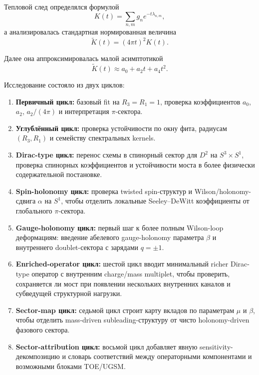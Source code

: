 \documentclass[12pt,a4paper]{article}
\begin{document}
Тепловой след определялся формулой
\begin{equation}
K(t)=\sum_{n,m} g_n e^{-t\lambda_{n,m}},
\end{equation}
а анализировалась стандартная нормированная величина
\begin{equation}
\widetilde K(t)=(4\pi t)^2 K(t).
\end{equation}

Далее она аппроксимировалась малой асимптотикой
\begin{equation}
\widetilde K(t)\approx a_0+a_2 t+a_4 t^2.
\end{equation}

Исследование состояло из двух циклов:
\begin{enumerate}
    \item \textbf{Первичный цикл:} базовый fit на \(R_3=R_1=1\), проверка коэффициентов \(a_0\), \(a_2\), \(a_2/(4\pi)\) и интерпретация \(\pi\)-сектора.
    \item \textbf{Углублённый цикл:} проверка устойчивости по окну фита, радиусам \((R_3,R_1)\) и семейству спектральных kernels.
    \item \textbf{Dirac-type цикл:} перенос схемы в спинорный сектор для \(D^2\) на \(S^3\times S^1\), проверка спинорных коэффициентов и устойчивости моста в более физически содержательной постановке.
    \item \textbf{Spin-holonomy цикл:} проверка twisted spin-структур и Wilson/holonomy-сдвига \(\alpha\) на \(S^1\), чтобы отделить локальные Seeley--DeWitt коэффициенты от глобального \(\pi\)-сектора.
    \item \textbf{Gauge-holonomy цикл:} первый шаг к более полным Wilson-loop деформациям: введение абелевого gauge-holonomy параметра \(\beta\) и внутреннего doublet-сектора с зарядами \(q=\pm1\).
    \item \textbf{Enriched-operator цикл:} шестой цикл вводит минимальный richer Dirac-type оператор с внутренним charge/mass multiplet, чтобы проверить, сохраняется ли мост при появлении нескольких внутренних каналов и субведущей структурной нагрузки.
    \item \textbf{Sector-map цикл:} седьмой цикл строит карту вкладов по параметрам \(\mu\) и \(\beta\), чтобы отделить mass-driven subleading-структуру от чисто holonomy-driven фазового сектора.
    \item \textbf{Sector-attribution цикл:} восьмой цикл добавляет явную sensitivity-декомпозицию и словарь соответствий между операторными компонентами и возможными блоками TOE/UGSM.
\end{enumerate}
\end{document}

